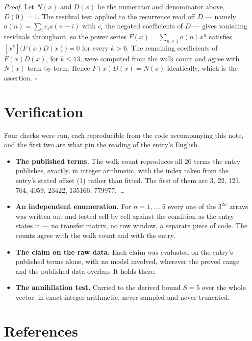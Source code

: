 \documentclass[11pt]{article}
\theoremstyle{definition}
\begin{document}
{\itshape Proof.} Let $N(x)$ and $D(x)$ be the numerator and denominator above, $D(0)=1$. The residual test applied to the recurrence read off $D$ --- namely $a(n) = \sum_i c_i a(n-i)$ with $c_i$ the negated coefficients of $D$ --- gives vanishing residuals throughout, so the power series $F(x)=\sum_{n\ge 1}a(n)x^n$ satisfies $[x^k]\bigl(F(x)D(x)\bigr) = 0$ for every $k > 6$. The remaining coefficients of $F(x)D(x)$, for $k \le 13$, were computed from the walk count and agree with $N(x)$ term by term. Hence $F(x)D(x) = N(x)$ identically, which is the assertion. $\square$

\section{Verification}

Four checks were run, each reproducible from the code accompanying this note, and the first two are what pin the reading of the entry's English.

\begin{itemize}

\item {\bfseries The published terms.} The walk count reproduces all 20 terms the entry publishes, exactly, in integer arithmetic, with the index taken from the entry's stated offset (1) rather than fitted. The first of them are 3, 22, 121, 704, 4059, 23422, 135166, 779977,~\dots

\item {\bfseries An independent enumeration.} For $n = 1,\dots,5$ every one of the $3^{2n}$ arrays was written out and tested cell by cell against the condition as the entry states it --- no transfer matrix, no row window, a separate piece of code. The counts agree with the walk count and with the entry.

\item {\bfseries The claim on the raw data.} Each claim was evaluated on the entry's published terms alone, with no model involved, wherever the proved range and the published data overlap. It holds there.

\item {\bfseries The annihilation test.} Carried to the derived bound $S = 5$ over the whole vector, in exact integer arithmetic, never sampled and never truncated.

\end{itemize}

\section{References}
\end{document}

